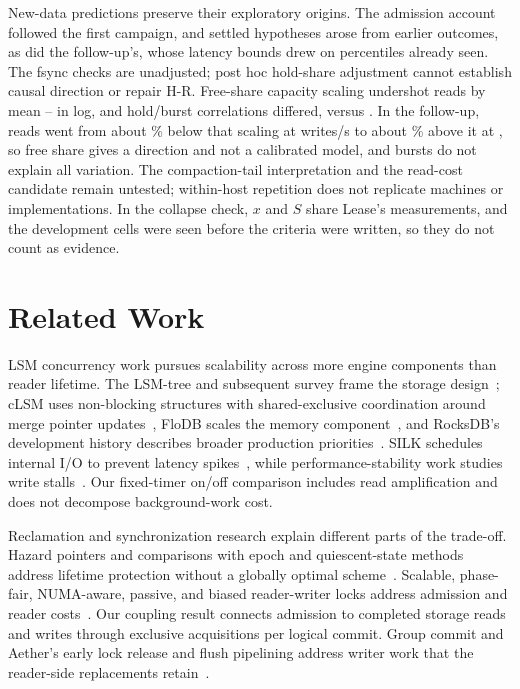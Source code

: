 \documentclass[conference]{IEEEtran}
\begin{document}
New-data predictions preserve their exploratory origins. The admission account followed the first campaign, and settled hypotheses arose from earlier outcomes, as did the follow-up's, whose latency bounds drew on percentiles already seen. The fsync checks are unadjusted; post hoc hold-share adjustment cannot establish causal direction or repair H-R. Free-share capacity scaling undershot reads by mean \HoldUndershootOn{}--\HoldUndershootSettled{} in log, and hold/burst correlations differed, \HoldVsBurstOn{} versus \HoldVsBurstSettled{}. In the follow-up, reads went from about \FollowScalingLow{}\% below that scaling at \FollowRateLow{} writes/s to about \FollowScalingHigh{}\% above it at \FollowRateHigh{}, so free share gives a direction and not a calibrated model, and bursts do not explain all variation. The compaction-tail interpretation and the read-cost candidate remain untested; within-host repetition does not replicate machines or implementations. In the collapse check, $x$ and $S$ share Lease's measurements, and the development cells were seen before the criteria were written, so they do not count as evidence.

\section{Related Work}
LSM concurrency work pursues scalability across more engine components than reader lifetime. The LSM-tree and subsequent survey frame the storage design~\cite{oneil1996lsm,luo2020}; cLSM uses non-blocking structures with shared-exclusive coordination around merge pointer updates~\cite{golan2015}, FloDB scales the memory component~\cite{flodb2017}, and RocksDB's development history describes broader production priorities~\cite{dong2021}. SILK schedules internal I/O to prevent latency spikes~\cite{balmau2019}, while performance-stability work studies write stalls~\cite{luo2019}. Our fixed-timer on/off comparison includes read amplification and does not decompose background-work cost.

Reclamation and synchronization research explain different parts of the trade-off. Hazard pointers and comparisons with epoch and quiescent-state methods address lifetime protection without a globally optimal scheme~\cite{michael2004,hart2007}. Scalable, phase-fair, NUMA-aware, passive, and biased reader-writer locks address admission and reader costs~\cite{mellor1991,brandenburg2009,calciu2013,liu2014,bravo2019}. Our coupling result connects admission to completed storage reads and writes through exclusive acquisitions per logical commit. Group commit and Aether's early lock release and flush pipelining address writer work that the reader-side replacements retain~\cite{dewitt1984,aether2010}.
\end{document}
